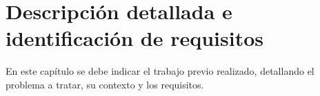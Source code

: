\section{Descripción detallada e identificación de requisitos}

En este capítulo se debe indicar el trabajo previo realizado, detallando el problema a tratar, su contexto y los requisitos.